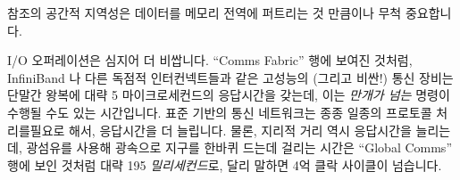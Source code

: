 \fi

참조의 공간적 지역성은 데이터를 메모리 전역에 퍼트리는 것 만큼이나 무척
중요합니다.

I/O 오퍼레이션은 심지어 더 비쌉니다.
``Comms Fabric'' 행에 보여진 것처럼, InfiniBand 나 다른 독점적 인터컨넥트들과
같은 고성능의 (그리고 비싼!) 통신 장비는 단말간 왕복에 대략 5 마이크로세컨드의
응답시간을 갖는데, 이는 \emph{만개가 넘는} 명령이 수행될 수도 있는 시간입니다.
표준 기반의 통신 네트워크는 종종 일종의 프로토콜 처리를필요로 해서, 응답시간을
더 늘립니다.
물론, 지리적 거리 역시 응답시간을 늘리는데, 광섬유를 사용해 광속으로 지구를
한바퀴 드는데 걸리는 시간은 ``Global Comms'' 행에 보인 것처럼 대략 195
\emph{밀리세컨드}로, 달리 말하면 4억 클락 사이클이 넘습니다.


